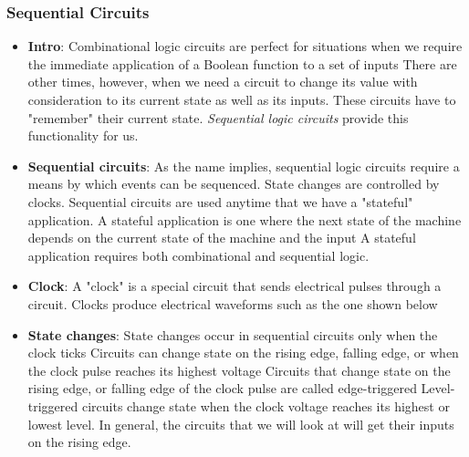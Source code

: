 \documentclass{report}
\begin{document}
    \subsubsection{Sequential Circuits}
    \begin{itemize}
        \item \textbf{Intro}: Combinational logic circuits are perfect for situations when we require the immediate application of a Boolean function to a set of inputs
            \bigbreak \noindent 
            There are other times, however, when we need a circuit to change its value with consideration to its current state as well as its inputs.
            \bigbreak \noindent 
            These circuits have to "remember" their current state.
            \bigbreak \noindent 
            \textit{Sequential logic circuits} provide this functionality for us.
        \item \textbf{Sequential circuits}: As the name implies, sequential logic circuits require a means by which events can be sequenced.
            \bigbreak \noindent 
            State changes are controlled by clocks.
            \bigbreak \noindent 
            Sequential circuits are used anytime that we have a "stateful" application.
            \bigbreak \noindent 
            A stateful application is one where the next state of the machine depends on the current state of the machine and the input
            \bigbreak \noindent 
            A stateful application requires both combinational and sequential logic.
        \item \textbf{Clock}: A "clock" is a special circuit that sends electrical pulses through a circuit.
            \bigbreak \noindent 
            Clocks produce electrical waveforms such as the one shown below
            \bigbreak \noindent 
        \item \textbf{State changes}: State changes occur in sequential circuits only when the clock ticks
            \bigbreak \noindent 
            Circuits can change state on the rising edge, falling edge, or when the clock pulse reaches its highest voltage
            \bigbreak \noindent 
            \bigbreak \noindent 
            Circuits that change state on the rising edge, or falling edge of the clock pulse are called edge-triggered
            \bigbreak \noindent 
            Level-triggered circuits change state when the clock voltage reaches its highest or lowest level.
            \bigbreak \noindent 
            In general, the circuits that we will look at will get their inputs on the rising edge.

\end{itemize}
\end{document}
